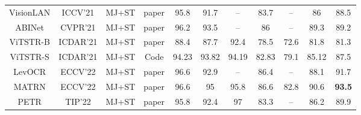 \documentclass[runningheads]{llncs}
\begin{document}
\begin{table}[htbp]
\begin{tabular}{ccccccccccc}
  VisionLAN\cite{wang2021two_VisionLAN}      & ICCV’21                & MJ+ST                          & paper\cite{zhao2023clip4str}                                                                                  & 95.8          & 91.7           & –             & 83.7           & –              & 86            & 88.5          \\
  ABINet\cite{fang2021read_ABInet}         & CVPR’21                & MJ+ST                          & paper\cite{zhao2023clip4str}                                                                                  & 96.2          & 93.5           & –             & 86             & –              & 89.3          & 89.2          \\
  ViTSTR-B\cite{atienza2021vision_VITSTR}       & ICDAR’21               & MJ+ST                          & paper\cite{zhao2023clip4str}                                                                                  & 88.4          & 87.7           & 92.4          & 78.5           & 72.6           & 81.8          & 81.3          \\
  ViTSTR-S\cite{atienza2021vision_VITSTR}       & ICDAR’21               & MJ+ST                          & \multicolumn{1}{c}{Code}                                                                                & 94.23         & 93.82          & 94.19         & 82.83          & 79.1           & 85.12         & 87.5          \\
  LevOCR\cite{da2022levenshtein_LevOCR}        & ECCV’22                & MJ+ST                          & paper\cite{zhao2023clip4str}                                                                                  & 96.6          & 92.9           & –             & 86.4           & –              & 88.1          & 91.7          \\
  MATRN\cite{na2022multi_matrn}          & ECCV’22                & MJ+ST                          & paper\cite{zhao2023clip4str}                                                                                  & 96.6          & 95             & 95.8          & 86.6           & 82.8           & 90.6          & \textbf{93.5} \\
  PETR\cite{wang2022petr_Petr}           & TIP’22                 & MJ+ST                          & paper\cite{zhao2023clip4str}                                                                                  & 95.8          & 92.4           & 97            & 83.3           & –              & 86.2          & 89.9          \\

\end{tabular}
\end{table}
\end{document}

